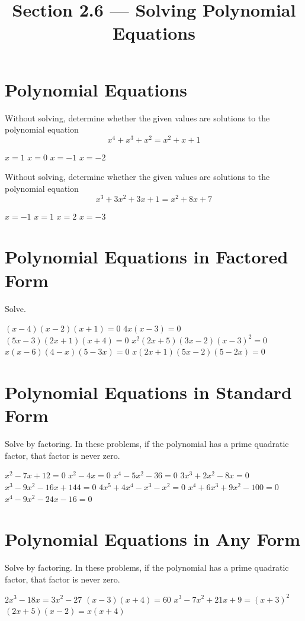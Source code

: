 

\title{Section 2.6 --- Solving Polynomial Equations}


\maketitle
\section*{Polynomial Equations}
\begin{senum}
\item Without solving, determine whether the given values are solutions to the polynomial equation $$x^4+x^3+x^2=x^2+x+1$$
\begin{nmenum}
\mitemxxxx
{$x=1$}
{$x=0$}
{$x=-1$}
{$x=-2$}
\end{nmenum}
\item Without solving, determine whether the given values are solutions to the polynomial equation $$x^3+3x^2+3x+1=x^2+8x+7$$
\begin{nmenum}
\mitemxxxx
{$x=-1$}
{$x=1$}
{$x=2$}
{$x=-3$}
\end{nmenum}
\end{senum}

\section*{Polynomial Equations in Factored Form}
Solve.
\begin{smenum}
\mitemxx
{$(x-4)(x-2)(x+1)=0$}
{$4x(x-3)=0$}
\mitemxx
{$(5x-3)(2x+1)(x+4)=0$}
{$x^2(2x+5)(3x-2)(x-3)^2=0$}
\mitemxx
{$x(x-6)(4-x)(5-3x)=0$}
{$x(2x+1)(5x-2)(5-2x)=0$}
\end{smenum}

\section*{Polynomial Equations in Standard Form}
Solve by factoring. In these problems, if the polynomial has a prime quadratic factor, that factor is never zero.
\begin{smenum}
\mitemxx
{$x^2-7x+12=0$}
{$x^2-4x=0$}
\mitemxx
{$x^4-5x^2-36=0$}
{$3x^3+2x^2-8x=0$}
\mitemxx
{$x^3-9x^2-16x+144=0$}
{$4x^5+4x^4-x^3-x^2=0$}
\mitemxx
{$x^4+6x^3+9x^2-100=0$}
{$x^4-9x^2-24x-16=0$}
\end{smenum}

\section*{Polynomial Equations in Any Form}
Solve by factoring. In these problems, if the polynomial has a prime quadratic factor, that factor is never zero.
\begin{smenum}
\mitemxx
{$2x^3-18x=3x^2-27$}
{$(x-3)(x+4)=60$}
\mitemxx
{$x^3-7x^2+21x+9=(x+3)^2$}
{$(2x+5)(x-2)=x(x+4)$}
\end{smenum}

